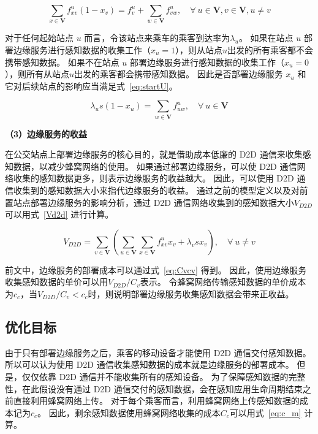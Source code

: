 \begin{equation}
  \label{eq:Vimpact}
    \sum_{x\in \boldsymbol{V}}f^u_{xv} (1-x_v) = f^u_v + \sum_{w\in \boldsymbol{V}}f^u_{vw}, \quad \forall \ u\in \boldsymbol{V}, v\in \boldsymbol{V}, u \neq v
\end{equation}

对于任何起始站点 $u$ 而言，令该站点来乘车的乘客到达率为$\lambda_u$。
如果在站点 $u$ 部署边缘服务进行感知数据的收集工作（$x_u = 1$），则从站点$u$出发的所有乘客都不会携带感知数据。
如果不在站点 $u$ 部署边缘服务进行感知数据的收集工作（$x_u = 0$），则所有从站点$u$出发的乘客都会携带感知数据。
因此是否部署边缘服务 $x_u$ 和它对后续站点的影响应当满足式~\eqref{eq:startU}。

\begin{equation}
\label{eq:startU}
\lambda_u s (1 - x_u) = \sum_{w\in \boldsymbol{V}}f^u_{uw}, \quad \forall \  u\in \boldsymbol{V}
\end{equation}

\textbf{（3）边缘服务的收益}

在公交站点上部署边缘服务的核心目的，就是借助成本低廉的 D2D 通信来收集感知数据，以减少蜂窝网络的使用。
如果通过部署边缘服务，可以使 D2D 通信网络收集的感知数据更多，则表示边缘服务的收益越大。
因此，可以使用 D2D 通信收集到的感知数据大小来指代边缘服务的收益。
通过之前的模型定义以及对前置站点部署边缘服务的影响分析，通过 D2D 通信网络收集到的感知数据大小$V_{D2D}$可以用式~\eqref{Vd2d} 进行计算。

\begin{equation}
\label{Vd2d}
V_{D2D} = \sum_{v\in \boldsymbol{V}}(\sum_{u\in \boldsymbol{V}}\sum_{x\in \boldsymbol{V}}f^u_{xv} x_v + \lambda_v s x_v), \quad \forall \  u \neq v
\end{equation}

前文中，边缘服务的部署成本可以通过式~\eqref{eq:Cvcv} 得到。
因此，使用边缘服务收集感知数据的单价可以用$V_{D2D}/C_v$表示。
令蜂窝网络传输感知数据的单价成本为$c_c$，当$V_{D2D}/C_v < c_c$时，则说明部署边缘服务收集感知数据会带来正收益。

\subsection{优化目标}

由于只有部署边缘服务之后，乘客的移动设备才能使用 D2D 通信交付感知数据。
所以可以认为使用 D2D 通信收集感知数据的成本就是边缘服务的部署成本。
但是，仅仅依靠 D2D 通信并不能收集所有的感知设备。
为了保障感知数据的完整性，在此假设没有通过 D2D 通信交付的感知数据，会在感知应用生命周期结束之前直接利用蜂窝网络上传。
对于每个乘客而言，利用蜂窝网络上传感知数据的成本记为$c_c$。
因此，剩余感知数据使用蜂窝网络收集的成本$C_c$可以用式~\eqref{eq:c_m} 计算。

